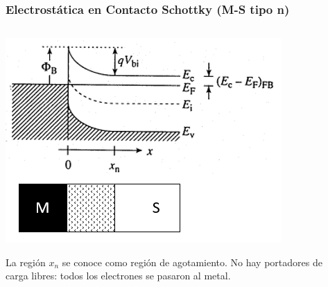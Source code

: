 \documentclass[10pt,t,aspectratio=169]{beamer}
\begin{document}
\begin{frame}[t]
    \frametitle{Electrostática en Contacto Schottky (M-S tipo n)}

\begin{columns}

\begin{column}{0.4\textwidth}

\centering
\includegraphics[width=\textwidth]{figures/schottky_electrostatics_1.png}

\flushleft
La región $x_n$ se conoce como región de agotamiento. No hay portadores de carga libres: todos los electrones se pasaron al metal.

\end{column}

\begin{column}{0.18\textwidth}


\end{column}
\end{columns}
\end{frame}
\end{document}
